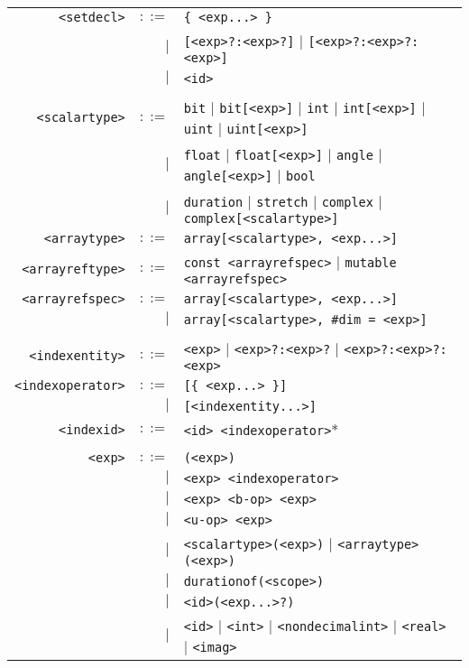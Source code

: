 \documentclass[notitlepage]{article}
\begin{document}
\begin{longtable}{rrl}
	\texttt{<setdecl>} & $::=$ & \texttt{\{ <exp...> \}} \\
	    & $\mid$ & \texttt{[<exp>?:<exp>?]} $\mid$ \texttt{[<exp>?:<exp>?:<exp>]} \\
	    & $\mid$ & \texttt{<id>} \\ \\
	\texttt{<scalartype>} & $::=$ & \texttt{bit} $\mid$ \texttt{bit[<exp>]} $\mid$ \texttt{int} $\mid$ \texttt{int[<exp>]} $\mid$ \texttt{uint} $\mid$ \texttt{uint[<exp>]} \\
	    & $\mid$ & \texttt{float} $\mid$ \texttt{float[<exp>]} $\mid$ \texttt{angle} $\mid$ \texttt{angle[<exp>]} $\mid$ \texttt{bool} \\
	    & $\mid$ & \texttt{duration} $\mid$ \texttt{stretch} $\mid$ \texttt{complex} $\mid$ \texttt{complex[<scalartype>]} \\
	\texttt{<arraytype>} & $::=$ & \texttt{array[<scalartype>, <exp...>]} \\
	\texttt{<arrayreftype>} & $::=$ & \texttt{const <arrayrefspec>} $\mid$ \texttt{mutable <arrayrefspec>} \\
	\texttt{<arrayrefspec>} & $::=$ & \texttt{array[<scalartype>, <exp...>]} \\
        & $\mid$ & \texttt{array[<scalartype>, \#dim = <exp>]} \\ \\
	\texttt{<indexentity>} & $::=$ & \texttt{<exp>} $\mid$ \texttt{<exp>?:<exp>?} $\mid$ \texttt{<exp>?:<exp>?:<exp>} \\
	\texttt{<indexoperator>} & $::=$ & \texttt{[\{ <exp...> \}]} \\
	    & $\mid$ & \texttt{[<indexentity...>]} \\
	\texttt{<indexid>} & $::=$ & \texttt{<id> <indexoperator>}* \\ \\
	\texttt{<exp>} & $::=$ & \texttt{(<exp>)} \\
	    & $\mid$ & \texttt{<exp> <indexoperator>} \\
	    & $\mid$ & \texttt{<exp> <b-op> <exp>} \\
	    & $\mid$ & \texttt{<u-op> <exp>} \\
	    & $\mid$ & \texttt{<scalartype>(<exp>)} $\mid$ \texttt{<arraytype>(<exp>)} \\
	    & $\mid$ & \texttt{durationof(<scope>)} \\
	    & $\mid$ & \texttt{<id>(<exp...>?)} \\
	    & $\mid$ & \texttt{<id>} $\mid$ \texttt{<int>} $\mid$ \texttt{<nondecimalint>} $\mid$ \texttt{<real>} $\mid$ \texttt{<imag>} \\

\end{longtable}
\end{document}
